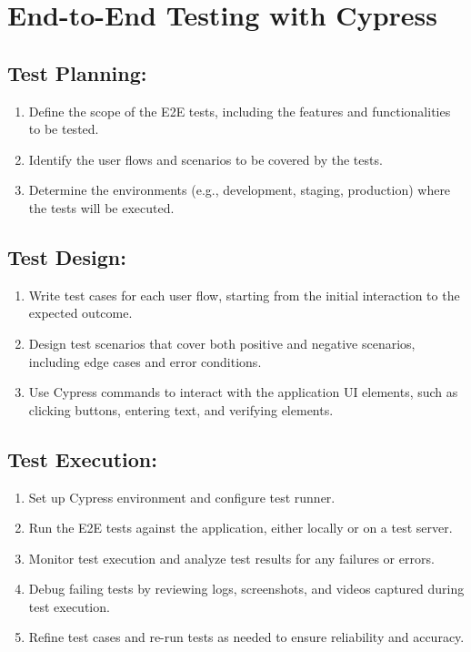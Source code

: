 \documentclass{article}
\begin{document}
\section{End-to-End Testing with Cypress}

\subsection{Test Planning:}
\begin{enumerate}[label=\arabic*.]
    \item Define the scope of the E2E tests, including the features and functionalities to be tested.
    \item Identify the user flows and scenarios to be covered by the tests.
    \item Determine the environments (e.g., development, staging, production) where the tests will be executed.
\end{enumerate}

\subsection{Test Design:}
\begin{enumerate}[label=\arabic*.]
    \item Write test cases for each user flow, starting from the initial interaction to the expected outcome.
    \item Design test scenarios that cover both positive and negative scenarios, including edge cases and error conditions.
    \item Use Cypress commands to interact with the application UI elements, such as clicking buttons, entering text, and verifying elements.
\end{enumerate}

\subsection{Test Execution:}
\begin{enumerate}[label=\arabic*.]
    \item Set up Cypress environment and configure test runner.
    \item Run the E2E tests against the application, either locally or on a test server.
    \item Monitor test execution and analyze test results for any failures or errors.
    \item Debug failing tests by reviewing logs, screenshots, and videos captured during test execution.
    \item Refine test cases and re-run tests as needed to ensure reliability and accuracy.
\end{enumerate}
\end{document}

